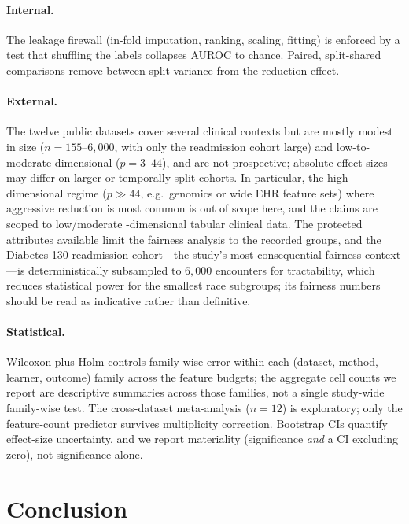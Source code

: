 \documentclass[fleqn,10pt]{wlscirep}
\begin{document}
\paragraph{Internal.} The leakage firewall (in-fold imputation, ranking, scaling, fitting) is
enforced by a test that shuffling the labels collapses AUROC to chance. Paired, split-shared
comparisons remove between-split variance from the reduction effect.

\paragraph{External.} The twelve public datasets cover several clinical contexts but are mostly modest
in size ($n=155$--$6{,}000$, with only the readmission cohort large) and low-to-moderate dimensional
($p=3$--$44$), and are not prospective; absolute effect sizes may differ on larger or temporally split
cohorts. In particular, the high-dimensional regime ($p\gg44$, e.g.\ genomics or wide EHR feature sets)
where aggressive
reduction is most common is out of scope here, and the claims are scoped to low/moderate
-dimensional tabular clinical data. The protected attributes available limit the fairness
analysis to the recorded groups, and the Diabetes-130 readmission cohort---the study's most
consequential fairness context---is deterministically subsampled to $6{,}000$ encounters for
tractability, which reduces statistical power for the smallest race subgroups; its fairness numbers
should be read as indicative rather than definitive.

\paragraph{Statistical.} Wilcoxon plus Holm controls family-wise error within each
(dataset, method, learner, outcome) family across the feature budgets; the aggregate cell counts we
report are descriptive summaries across those families, not a single study-wide family-wise test. The
cross-dataset meta-analysis ($n=12$) is exploratory; only the feature-count predictor survives
multiplicity correction. Bootstrap CIs quantify effect-size uncertainty, and we report materiality
(significance \emph{and} a CI excluding zero), not significance alone.

\section{Conclusion}
\label{sec:conclusion}
\end{document}
